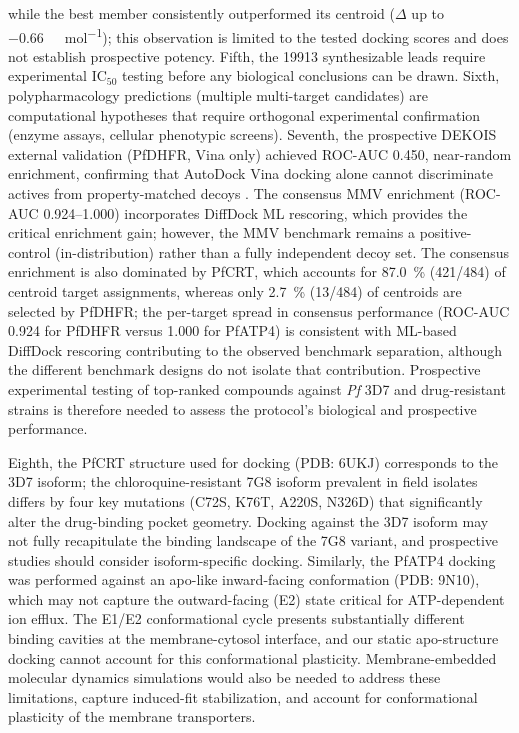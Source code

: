 \documentclass[journal=jcisd8,manuscript=article]{achemso}
\begin{document}
while the best member consistently outperformed its centroid ($\Delta$ up to \qty{-0.66}{\kilo\calorie\per\mole}); this observation is limited to the tested docking scores and does not establish prospective potency. Fifth,
the \num{19913} synthesizable leads require experimental IC$_{50}$ testing before any biological conclusions can be drawn. Sixth, polypharmacology predictions
(multiple multi-target candidates) are computational hypotheses that require orthogonal experimental confirmation (enzyme assays, cellular phenotypic screens).
Seventh, the prospective DEKOIS external validation (PfDHFR, Vina only) achieved ROC-AUC \num{0.450}, near-random enrichment, confirming that AutoDock Vina
docking alone cannot discriminate actives from property-matched decoys \cite{Bauer2013}. The consensus MMV enrichment (ROC-AUC \numrange{0.924}{1.000})
incorporates DiffDock ML rescoring, which provides the critical enrichment gain; however, the MMV benchmark remains a positive-control (in-distribution) rather
than a fully independent decoy set. The consensus enrichment is also dominated by PfCRT, which accounts for \qty{87.0}{\percent} (\num{421}/\num{484}) of
centroid target assignments, whereas only \qty{2.7}{\percent} (\num{13}/\num{484}) of centroids are selected by PfDHFR; the per-target spread in consensus
performance (ROC-AUC \num{0.924} for PfDHFR versus \num{1.000} for PfATP4) is consistent with ML-based DiffDock rescoring contributing to the observed benchmark separation, although the different benchmark designs do not isolate that contribution. Prospective experimental testing of top-ranked
compounds against \textit{Pf} 3D7 and drug-resistant strains is therefore needed to assess the protocol's biological and prospective performance.

Eighth, the PfCRT structure used for docking (PDB: 6UKJ) corresponds to the 3D7 isoform; the chloroquine-resistant 7G8 isoform prevalent in field isolates
differs by four key mutations (C72S, K76T, A220S, N326D) that significantly alter the drug-binding pocket geometry. Docking against the 3D7 isoform may not
fully recapitulate the binding landscape of the 7G8 variant, and prospective studies should consider isoform-specific docking. Similarly, the PfATP4 docking was
performed against an apo-like inward-facing conformation (PDB: 9N10), which may not capture the outward-facing (E2) state critical for ATP-dependent ion efflux.
The E1/E2 conformational cycle presents substantially different binding cavities at the membrane-cytosol interface, and our static apo-structure docking cannot
account for this conformational plasticity. Membrane-embedded molecular dynamics simulations would also be needed to address these limitations, capture
induced-fit stabilization, and account for conformational plasticity of the membrane transporters.
\end{document}
